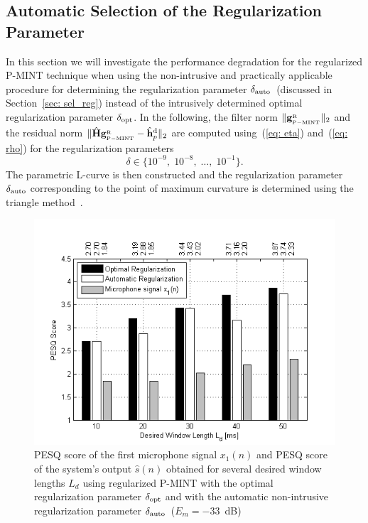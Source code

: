 \documentclass[10pt]{IEEEtran}
\begin{document}
\subsection{Automatic Selection of the Regularization Parameter}
\label{sec: auto}
In this section we will investigate the performance degradation for the regularized P-MINT technique when using the non-intrusive and practically applicable procedure for determining the regularization parameter $\delta_{\rm auto}$~(discussed in Section~\ref{sec: sel_reg}) instead of the intrusively determined optimal regularization parameter $\delta_{\rm opt}$.
In the following, the filter norm $\|\mathbf{g}_{{}_{\rm P-MINT}}^{{_{\rm R}}}\|_2$ and the residual norm $\|\hat{\mathbf{H}}\mathbf{g}_{{}_{\rm P-MINT}}^{{_{\rm R}}} - \hat{\mathbf{h}}_p^{\rm d} \|_2$ are computed using~(\ref{eq: eta}) and~(\ref{eq: rho}) for the regularization parameters
\begin{equation}
\delta \in \{10^{-9}, \; 10^{-8}, \; \ldots, \; 10^{-1} \}.
\end{equation}
The parametric L-curve is then constructed and the regularization parameter $\delta_{\rm auto}$ corresponding to the point of maximum curvature is determined using the triangle method~\cite{Castellanos_2002}.
\begin{figure}[t!]
\centering
\includegraphics[scale = 0.65]{Plots/PESQ_optandautofixederror_sys_5_error_-33}
\caption{PESQ score of the first microphone signal $x_1(n)$ and PESQ score of the system's output $\hat{s}(n)$ obtained for several desired window lengths $L_d$ using regularized P-MINT with the optimal regularization parameter $\delta_{\rm opt}$ and with the automatic non-intrusive regularization parameter $\delta_{\rm auto}$~($E_m = -33$~dB)}
\label{fig: autopesq1}
\end{figure}
\end{document}
